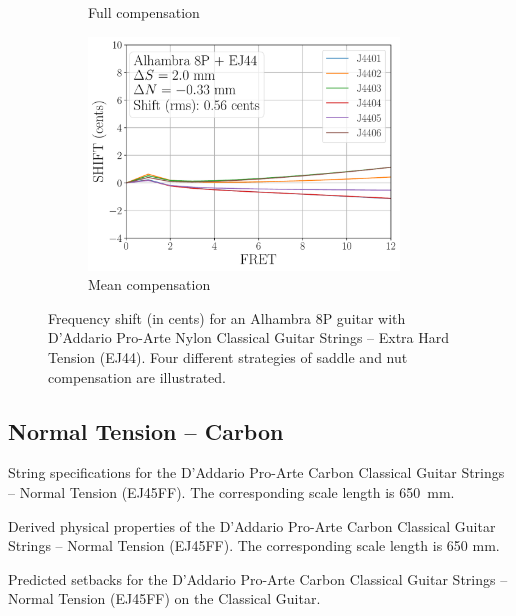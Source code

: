 \begin{figure}
\begin{subfigure}[b]{0.45\textwidth}
   \caption{Full compensation}
   \label{fig:shift_alhambra8p_ej44_full}
  \end{subfigure}
  \hspace{0.25in}
  \begin{subfigure}[b]{0.45\textwidth}
   \centering
   \includegraphics[width=3.25in]{../figures/shift_alhambra8p_ej44_mean}
   \caption{Mean compensation}
   \label{fig:shift_alhambra8p_ej44_mean}
  \end{subfigure}
  \caption{\label{fig:compensation_alhambra8p_ej44} Frequency shift (in cents) for an Alhambra 8P guitar with D'Addario Pro-Arte Nylon Classical Guitar Strings -- Extra Hard Tension (EJ44). Four different strategies of saddle and nut compensation are illustrated.}
 \end{figure}

 \newpage
 \subsection{Normal Tension -- Carbon}
 
 \begin{table}[htbp]
   \centering
   \caption{\label{tbl:ej45ff_mks} String specifications for the D'Addario Pro-Arte Carbon Classical Guitar Strings -- Normal Tension (EJ45FF). The corresponding scale length is 650~mm.}
   
 \end{table}%
 
 \begin{table}[htbp]
   \centering
   \caption{\label{tbl:ej45ff_props} Derived physical properties of the D'Addario Pro-Arte Carbon Classical Guitar Strings -- Normal Tension (EJ45FF). The corresponding scale length is 650 mm.}
   
 \end{table}%
 
 \begin{table}[htbp]
   \centering
   \caption{\label{tbl:ej45ff_setbacks} Predicted setbacks for the D'Addario Pro-Arte Carbon Classical Guitar Strings -- Normal Tension (EJ45FF) on the Classical Guitar.}
   
 \end{table}%
 
